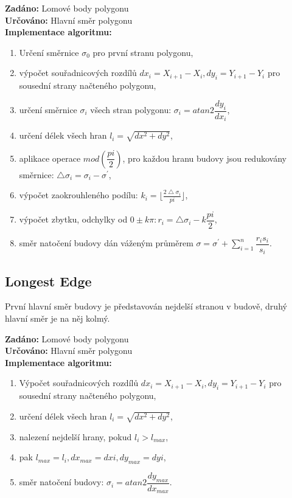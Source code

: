 \documentclass[a4paper, 12pt, oneside, titlepage]{article} %
\begin{document}
\noindent\textbf{Zadáno:} Lomové body polygonu\\ 
\noindent\textbf{Určováno:} Hlavní směr polygonu\\
\noindent\textbf{Implementace algoritmu:}\\
\begin{enumerate}
\item Určení směrnice $\sigma_0$ pro první stranu polygonu,
\item výpočet souřadnicových rozdílů $dx_i = X_{i+1}-X_{i}, dy_i=Y_{i+1}-Y_{i}$ pro sousední strany načteného polygonu,
\item určení směrnice $\sigma_i$ všech stran polygonu: $\sigma_i=atan2\dfrac{dy_i}{dx_i}$,
\item určení délek všech hran $l_i=\sqrt{dx^2+dy^2}$,
\item aplikace operace $mod(\dfrac{pi}{2})$, pro každou hranu budovy jsou redukovány směrnice: $\bigtriangleup\sigma_i=\sigma_i-\sigma^{'}$,
\item výpočet zaokrouhleného podílu: $k_i=\lfloor\frac{2\bigtriangleup\sigma_i}{pi}\rfloor$,
\item výpočet zbytku, odchylky od $0\pm k\pi : r_i=\bigtriangleup\sigma_i-k\dfrac{pi}{2}$,
\item směr natočení budovy dán váženým průměrem $\sigma=\sigma^{'}+ \sum_{i=1}^n \dfrac{r_is_i}{s_i}$.
\end{enumerate}

\subsection{Longest Edge} \label{le}
První hlavní směr budovy je představován nejdelší stranou v budově, druhý hlavní směr je na něj kolmý.

\noindent\textbf{Zadáno:} Lomové body polygonu\\
\noindent\textbf{Určováno:} Hlavní směr polygonu\\
\noindent\textbf{Implementace algoritmu:}\\
\begin{enumerate}
\item Výpočet souřadnicových rozdílů $dx_i = X_{i+1}-X_{i}, dy_i=Y_{i+1}-Y_{i}$ pro sousední strany načteného polygonu,
\item určení délek všech hran $l_i=\sqrt{dx^2+dy^2}$,
\item nalezení nejdelší hrany, pokud $l_i>l_{max}$,
\item \quad pak $l_{max}=l_i, dx_{max}=dxi, dy_{max}=dyi$,
\item směr natočení budovy: $\sigma_i=atan2\dfrac{dy_{max}}{dx_{max}}$.
\end{enumerate}
\end{document}
